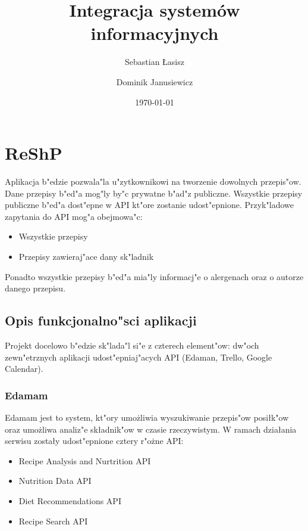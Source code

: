 \documentclass{article}
\title{Integracja systemów informacyjnych}
\author{
	Sebastian Łasisz
	\and
	Dominik Janusiewicz}
\date{\today}
\begin{document}
\maketitle

\section{ReShP}
	Aplikacja b"edzie pozwala"la u"zytkownikowi na tworzenie dowolnych przepis"ow. Dane przepisy b"ed"a mog"ly by"c prywatne b"ad"z publiczne. Wszystkie przepisy publiczne b"ed"a dost"epne w API kt"ore zostanie udost"epnione. Przyk"ladowe zapytania do API mog"a obejmowa"c:
	\begin{itemize}
		\item Wszystkie przepisy
		\item Przepisy zawieraj"ace dany sk"ladnik
	\end{itemize}
	Ponadto wszystkie przepisy b"ed"a mia"ly informacj"e o alergenach oraz o autorze danego przepisu.

\subsection{Opis funkcjonalno"sci aplikacji}

	Projekt docelowo b"edzie sk"lada"l si"e z czterech element"ow: dw"och zewn"etrznych aplikacji udost"epniaj"acych API (Edaman, Trello, Google Calendar).

\subsubsection{Edamam}
	Edamam jest to system, kt"ory umo\.zliwia wyszukiwanie przepis"ow posiłk"ow oraz umo\.zliwa analiz"e składnik"ow w czasie rzeczywistym. W ramach działania serwisu zostały udost"epnione cztery r"o\.zne API:
	\begin{itemize}
		\item Recipe Analysis and Nurtrition API
		\item Nutrition Data API
		\item Diet Recommendations API
		\item Recipe Search API
	\end{itemize}
	
\end{document}
